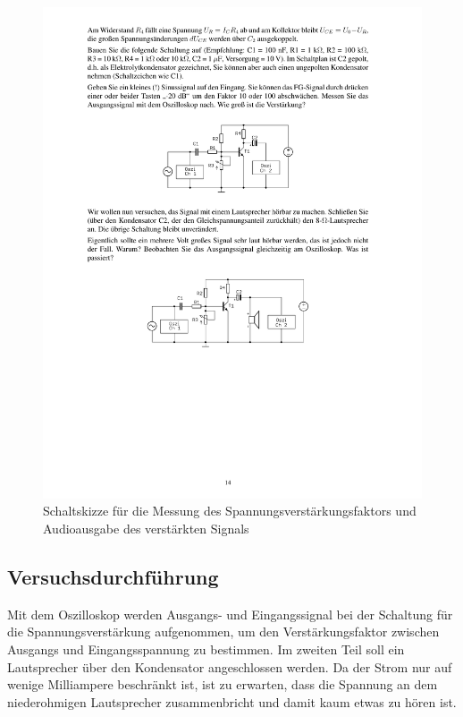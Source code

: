 \documentclass[12pt,a4paper]{article}
\begin{document}
\begin{figure}[H] 
  \centering
    \includegraphics[trim = 10mm 65mm 10mm 150mm, clip, scale = 1]{ep3_14[Page14].pdf}
  	\caption[Schaltskizze für die Messung des Spannungsverstärkungsfaktors und Audioausgabe des verstärkten Signals]{Schaltskizze für die Messung des Spannungsverstärkungsfaktors und Audioausgabe des verstärkten Signals\footnotemark}
  \label{fig:3}
\end{figure}

\subsection{Versuchsdurchführung}
Mit dem Oszilloskop werden Ausgangs- und Eingangssignal bei der Schaltung für die Spannungsverstärkung aufgenommen, um den Verstärkungsfaktor zwischen Ausgangs und Eingangsspannung zu bestimmen. Im zweiten Teil soll ein Lautsprecher über den Kondensator angeschlossen werden. Da der Strom nur auf wenige Milliampere beschränkt ist, ist zu erwarten, dass die Spannung an dem niederohmigen Lautsprecher zusammenbricht und damit kaum etwas zu hören ist.
\end{document}
